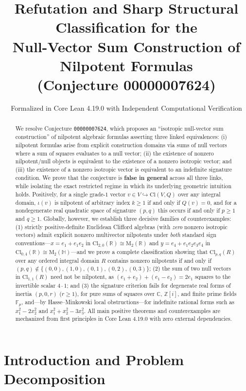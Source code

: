 \documentclass[11pt]{article}
\title{\textbf{Refutation and Sharp Structural Classification for the\\
Null-Vector Sum Construction of Nilpotent Formulas\\
(Conjecture 00000007624)}}
\author{Formalized in Core Lean 4.19.0 with Independent Computational Verification}
\date{}
\theoremstyle{definition}
\newcommand{\Cl}{\mathrm{Cl}}
\newcommand{\Mat}{\mathrm{M}}
\newcommand{\F}{\mathbb{F}}
\newcommand{\R}{\mathbb{R}}
\newcommand{\Z}{\mathbb{Z}}
\newcommand{\C}{\mathbb{C}}
\newcommand{\HH}{\mathbb{H}}
\begin{document}
\maketitle

\begin{abstract}
We resolve Conjecture \texttt{00000007624}, which proposes an ``isotropic null-vector sum
construction'' of nilpotent algebraic formulas asserting three linked equivalences:
(i) nilpotent formulas arise from explicit construction domains via sums of null vectors
where a sum of squares evaluates to a null vector; (ii) the existence of nonzero
nilpotent/null objects is equivalent to the existence of a nonzero isotropic vector; and
(iii) the existence of a nonzero isotropic vector is equivalent to an indefinite signature
condition. We prove that the conjecture is \textbf{false in general} across all three
links, while isolating the exact restricted regime in which its underlying geometric
intuition holds. Positively, for a single grade-$1$ vector $v \in V \hookrightarrow \Cl(V, Q)$
over any integral domain, $\iota(v)$ is nilpotent of arbitrary index $k \ge 1$ if and only
if $Q(v) = 0$, and for a nondegenerate real quadratic space of signature $(p, q)$ this
occurs if and only if $p \ge 1$ and $q \ge 1$. Globally, however, we establish three
decisive families of counterexamples: (1) strictly positive-definite Euclidean Clifford
algebras (with \emph{zero} nonzero isotropic vectors) admit explicit nonzero multivector
nilpotents under \emph{both} standard sign conventions---$x = e_1 + e_1 e_2$ in
$\Cl_{2,0}(\R) \cong \Mat_2(\R)$ and $y = e_4 + e_1 e_2 e_3 e_4$ in
$\Cl_{0,4}(\R) \cong \Mat_2(\HH)$---and we prove a complete classification showing that
$\Cl_{p,q}(R)$ over any ordered integral domain $R$ contains nonzero nilpotents if and
only if $(p, q) \notin \{(0,0), (1,0), (0,1), (0,2), (0,3)\}$; (2) the sum of two null
vectors in $\Cl_{1,1}(R)$ need not be nilpotent, as $(e_1 + e_2) + (e_1 - e_2) = 2 e_1$
squares to the invertible scalar $4 \cdot 1$; and (3) the signature criterion fails for
degenerate real forms of inertia $(p, 0, r)$ ($r \ge 1$), for pure sums of squares over
$\C$, $\Z[i]$, and finite prime fields $\F_p$, and---by Hasse--Minkowski local
obstructions---for indefinite rational forms such as $x_1^2 - 2 x_2^2$ and
$x_1^2 + x_2^2 - 3 x_3^2$. All main positive theorems and counterexamples are mechanized
from first principles in Core Lean 4.19.0 with zero external dependencies.
\end{abstract}

\section{Introduction and Problem Decomposition}
\end{document}
